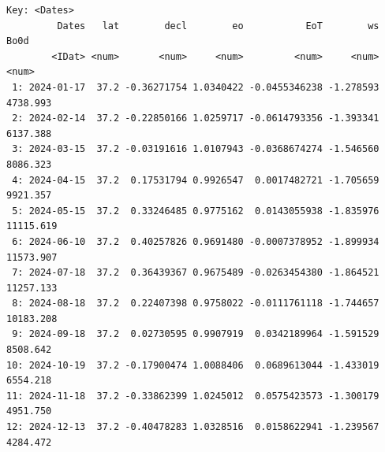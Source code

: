 \begin{verbatim}
Key: <Dates>
         Dates   lat        decl        eo           EoT        ws      Bo0d
        <IDat> <num>       <num>     <num>         <num>     <num>     <num>
 1: 2024-01-17  37.2 -0.36271754 1.0340422 -0.0455346238 -1.278593  4738.993
 2: 2024-02-14  37.2 -0.22850166 1.0259717 -0.0614793356 -1.393341  6137.388
 3: 2024-03-15  37.2 -0.03191616 1.0107943 -0.0368674274 -1.546560  8086.323
 4: 2024-04-15  37.2  0.17531794 0.9926547  0.0017482721 -1.705659  9921.357
 5: 2024-05-15  37.2  0.33246485 0.9775162  0.0143055938 -1.835976 11115.619
 6: 2024-06-10  37.2  0.40257826 0.9691480 -0.0007378952 -1.899934 11573.907
 7: 2024-07-18  37.2  0.36439367 0.9675489 -0.0263454380 -1.864521 11257.133
 8: 2024-08-18  37.2  0.22407398 0.9758022 -0.0111761118 -1.744657 10183.208
 9: 2024-09-18  37.2  0.02730595 0.9907919  0.0342189964 -1.591529  8508.642
10: 2024-10-19  37.2 -0.17900474 1.0088406  0.0689613044 -1.433019  6554.218
11: 2024-11-18  37.2 -0.33862399 1.0245012  0.0575423573 -1.300179  4951.750
12: 2024-12-13  37.2 -0.40478283 1.0328516  0.0158622941 -1.239567  4284.472
\end{verbatim}

